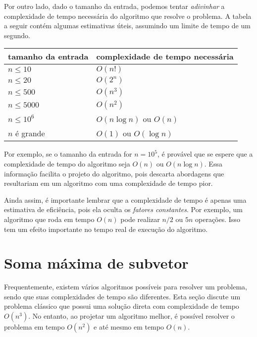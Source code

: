 Por outro lado, dado o tamanho da entrada, 
podemos tentar \emph{adivinhar} 
a complexidade de tempo necessária do algoritmo 
que resolve o problema. 
A tabela a seguir contém algumas estimativas úteis, 
assumindo um limite de tempo de um segundo.

\begin{center}
\begin{tabular}{ll}
tamanho da entrada & complexidade de tempo necessária \\
\hline
$n \le 10$ & $O(n!)$ \\
$n \le 20$ & $O(2^n)$ \\
$n \le 500$ & $O(n^3)$ \\
$n \le 5000$ & $O(n^2)$ \\
$n \le 10^6$ & $O(n \log n)$ ou $O(n)$ \\
$n$ é grande & $O(1)$ ou $O(\log n)$ \\
\end{tabular}
\end{center}

Por exemplo, se o tamanho da entrada for $n=10^5$, 
é provável que se espere que a complexidade de tempo do algoritmo seja $O(n)$ ou $O(n \log n)$. 
Essa informação facilita o projeto do algoritmo, pois descarta abordagens que resultariam 
em um algoritmo com uma complexidade de tempo pior.


Ainda assim, é importante lembrar que a complexidade de tempo é apenas uma estimativa de eficiência, pois ela oculta os \emph{fatores constantes}. Por exemplo, um algoritmo que roda em tempo $O(n)$ pode realizar $n/2$ ou $5n$ operações. Isso tem um efeito importante no tempo real de execução do algoritmo.

\section{Soma máxima de subvetor}


Frequentemente, existem vários algoritmos possíveis para resolver um problema, sendo que suas complexidades de tempo são diferentes. Esta seção discute um problema clássico que possui uma solução direta com complexidade de tempo $O(n^3)$. No entanto, ao projetar um algoritmo melhor, é possível resolver o problema em tempo $O(n^2)$ e até mesmo em tempo $O(n)$.

